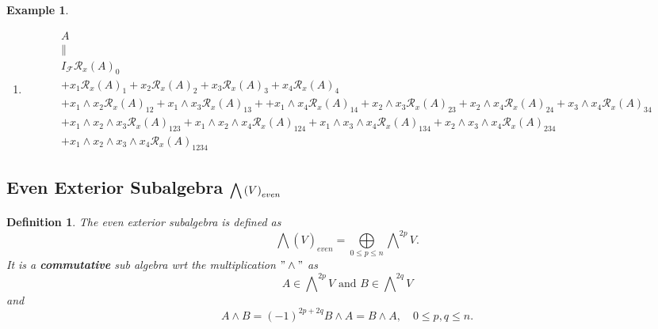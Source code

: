 \documentclass[aps,preprint]{revtex4}%
\newtheorem{definition}[theorem]{Definition}
\newtheorem{example}[theorem]{Example}
\begin{document}
\begin{example}
\begin{enumerate}
\item
\begin{gather}
A\\
\parallel\\
I_{\mathcal{F}}\mathcal{R}_{x}\left(  A\right)  _{0}\\
+x_{1}\mathcal{R}_{x}\left(  A\right)  _{1}+x_{2}\mathcal{R}_{x}\left(
A\right)  _{2}+x_{3}\mathcal{R}_{x}\left(  A\right)  _{3}+x_{4}\mathcal{R}%
_{x}\left(  A\right)  _{4}\\
+x_{1}\wedge x_{2}\mathcal{R}_{x}\left(  A\right)  _{12}+x_{1}\wedge
x_{3}\mathcal{R}_{x}\left(  A\right)  _{13}++x_{1}\wedge x_{4}\mathcal{R}%
_{x}\left(  A\right)  _{14}+x_{2}\wedge x_{3}\mathcal{R}_{x}\left(  A\right)
_{23}+x_{2}\wedge x_{4}\mathcal{R}_{x}\left(  A\right)  _{24}+x_{3}\wedge
x_{4}\mathcal{R}_{x}\left(  A\right)  _{34}\\
+x_{1}\wedge x_{2}\wedge x_{3}\mathcal{R}_{x}\left(  A\right)  _{123}%
+x_{1}\wedge x_{2}\wedge x_{4}\mathcal{R}_{x}\left(  A\right)  _{124}%
+x_{1}\wedge x_{3}\wedge x_{4}\mathcal{R}_{x}\left(  A\right)  _{134}%
+x_{2}\wedge x_{3}\wedge x_{4}\mathcal{R}_{x}\left(  A\right)  _{234}\\
+x_{1}\wedge x_{2}\wedge x_{3}\wedge x_{4}\mathcal{R}_{x}\left(  A\right)
_{1234}%
\end{gather}

\end{enumerate}
\end{example}

\subsection{Even Exterior Subalgebra $%
{\displaystyle\protect\bigwedge}
\left(  V\right)  _{even}$}

\begin{definition}
The even exterior subalgebra is defined as
\begin{equation}%
{\displaystyle\bigwedge}
\left(  \overset{}{V}\right)  _{even}=%
{\displaystyle\bigoplus\limits_{0\leq p\leq n}}
{\displaystyle\bigwedge\nolimits^{2p}}
V.
\end{equation}
It is a\textbf{ commutative }sub algebra wrt the multiplication $"\wedge"$ as
\begin{equation}
A\in%
{\textstyle\bigwedge\nolimits^{2p}}
V\text{ and }B\in%
{\textstyle\bigwedge\nolimits^{2q}}
V
\end{equation}
and
\begin{equation}
A\wedge B=\left(  -1\right)  ^{2p+2q}B\wedge A=B\wedge A,\quad0\leq p,q\leq n.
\end{equation}

\end{definition}
\end{document}
